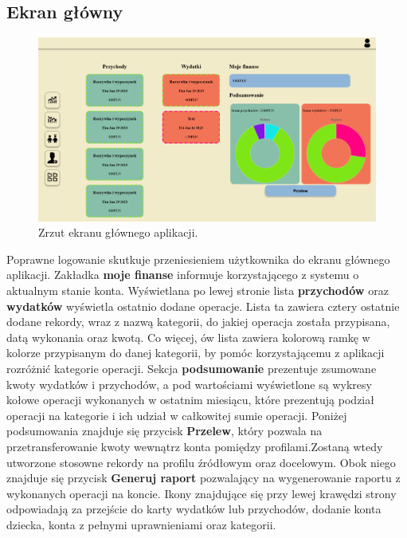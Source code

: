 \documentclass[12pt,a4paper,oneside]{article}
\begin{document}
\subsection{Ekran główny}
\begin{figure}[H]
    \centering
    \includegraphics[width=\hsize,keepaspectratio]{images/profile.png}
    \caption{Zrzut ekranu głównego aplikacji.}
\end{figure}
Poprawne logowanie skutkuje przeniesieniem użytkownika do ekranu głównego
aplikacji. Zakładka \textbf{moje finanse} informuje korzystającego z systemu o
aktualnym stanie konta. Wyświetlana po lewej stronie lista \textbf{przychodów}
oraz \textbf{wydatków} wyświetla ostatnio dodane operacje. Lista ta zawiera
cztery ostatnie dodane rekordy, wraz z nazwą kategorii, do jakiej operacja
została przypisana, datą wykonania oraz kwotą. Co więcej, ów lista zawiera
kolorową ramkę w kolorze przypisanym do danej kategorii, by pomóc korzystającemu
z aplikacji rozróżnić kategorie operacji. Sekcja \textbf{podsumowanie}
prezentuje zsumowane kwoty wydatków i przychodów, a pod wartościami wyświetlone
są wykresy kołowe operacji wykonanych w ostatnim miesiącu,
które prezentują podział operacji na kategorie i ich udział w
całkowitej sumie operacji. Poniżej podsumowania znajduje się przycisk
\textbf{Przelew}, który pozwala na przetransferowanie kwoty wewnątrz konta
pomiędzy profilami.Zostaną wtedy utworzone stosowne rekordy na profilu źródłowym
oraz docelowym. Obok niego znajduje się przycisk \textbf{Generuj raport}
pozwalający na wygenerowanie raportu z wykonanych operacji na koncie.
Ikony znajdujące się przy lewej krawędzi strony odpowiadają za
przejście do karty wydatków lub przychodów, dodanie konta dziecka, konta
z pełnymi uprawnieniami oraz kategorii.
\end{document}
